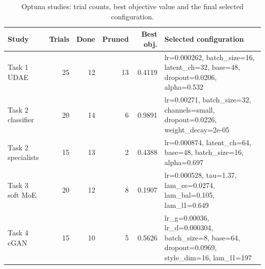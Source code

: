 \begin{table}[t]
\centering
\caption{Optuna studies: trial counts, best objective value and the final selected configuration.}
\label{tab:optuna}
\footnotesize
\begin{tabular}{lrrrrp{9cm}}
\toprule
Study & Trials & Done & Pruned & Best obj. & Selected configuration \\
\midrule
Task 1 UDAE & 25 & 12 & 13 & 0.4119 & lr=0.000262, batch\_size=16, latent\_ch=32, base=48, dropout=0.0206, alpha=0.532 \\
Task 2 classifier & 20 & 14 & 6 & 0.9891 & lr=0.00271, batch\_size=32, channels=small, dropout=0.0226, weight\_decay=2e-05 \\
Task 2 specialists & 15 & 13 & 2 & 0.4388 & lr=0.000874, latent\_ch=64, base=48, batch\_size=16, alpha=0.697 \\
Task 3 soft MoE & 20 & 12 & 8 & 0.1907 & lr=0.000528, tau=1.37, lam\_ce=0.0274, lam\_bal=0.105, lam\_l1=0.649 \\
Task 4 cGAN & 15 & 10 & 5 & 0.5626 & lr\_g=0.00036, lr\_d=0.000304, batch\_size=8, base=64, dropout=0.0969, style\_dim=16, lam\_l1=197 \\
\bottomrule
\end{tabular}
\end{table}
